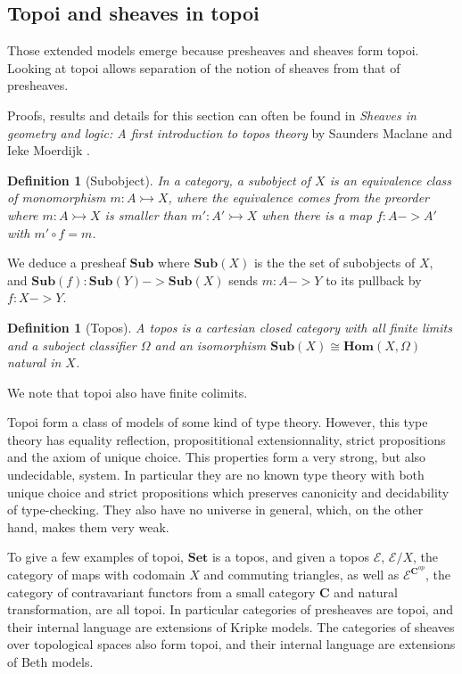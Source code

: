 \documentclass[11pt]{article}
\newtheorem{definition}[theorem]{Definition}
\newcommand{\0}{\mathbf{0}}
\newcommand{\1}{\mathbf{1}}
\newcommand{\mono}{\rightarrowtail}
\begin{document}
\subsection{Topoi and sheaves in topoi}\label{topoi}

Those extended models emerge because presheaves and sheaves form topoi. Looking at topoi allows separation of the notion of sheaves from that of presheaves.

Proofs, results and details for this section can often be found in \emph{Sheaves in geometry and logic: A first introduction to topos theory} by Saunders Maclane and Ieke Moerdijk \cite{maclane2012sheaves}.

\begin{definition}[Subobject]
    In a category, a \emph{subobject} of $X$ is an equivalence class of monomorphism $m : A \mono X$, where the equivalence comes from the preorder where $ m : A \mono X $ is smaller than $ m' : A' \mono X$ when there is a map $f : A -> A'$ with $ m' \circ f = m$.
\end{definition}

We deduce a presheaf $\mathbf{Sub}$ where $\mathbf{Sub}(X)$ is the the set of subobjects of $X$, and $\mathbf{Sub}(f) : \mathbf{Sub}(Y) -> \mathbf{Sub}(X)$ sends $m : A -> Y$ to its pullback by $f : X -> Y $. 

\begin{definition}[Topos]\label{topos}
    A \emph{topos} is a cartesian closed category with all finite limits and a suboject \emph{classifier} $\Omega$ and an isomorphism $\mathbf{Sub}(X)\cong \mathbf{Hom}(X, \Omega)$ natural in $X$.
\end{definition}

We note that topoi also have finite colimits.

Topoi form a class of models of some kind of type theory.
However, this type theory has equality reflection, proposititional extensionnality, strict propositions and the axiom of unique choice. This properties form a very strong, but also undecidable, system. In particular they are no known type theory with both unique choice and strict propositions which preserves canonicity and decidability of type-checking. They also have no universe in general, which, on the other hand, makes them very weak.


To give a few examples of topoi, $\mathbf{Set}$ is a topos, and given a topos $\mathcal E$, $\mathcal{E}/X$, the category of maps with codomain $X$ and commuting triangles, as well as $\mathcal{E}^{\mathbf{C}^{op}}$, the category of contravariant functors from a small category $\mathbf{C}$ and natural transformation, are all topoi. In particular categories of presheaves are topoi, and their internal language are extensions of Kripke models. The categories of sheaves over topological spaces also form topoi, and their internal language are extensions of Beth models.
\end{document}
